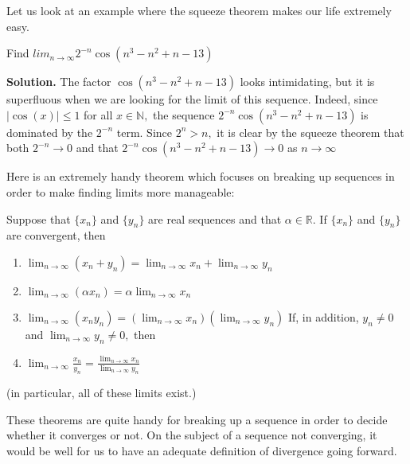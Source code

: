 Let us look at an example where the squeeze theorem makes our life extremely easy.

\begin{example}
Find $lim_{n \to \infty}2^{-n} \cos (n^3 - n^2 + n -13)$ \newline

\textbf{Solution.} The factor $\cos(n^3 - n^2 + n -13)$ looks intimidating, but it is superfluous when we are looking for the limit of this sequence. \newline
Indeed, since $|\cos(x)| \leq 1$ for all $x \in \mathbb{N},$ the sequence $2^{-n} \cos(n^3 - n^2 + n -13)$ is dominated by the $2^{-n}$ term. \newline
Since $2^n > n,$ it is clear by the squeeze theorem that both $2^{-n} \to 0$ and that $2^{-n} \cos(n^3 - n^2 + n -13) \to 0$ as $n \to \infty$ 
\end{example}

Here is an extremely handy theorem which focuses on breaking up sequences in order to make finding limits more manageable:

\begin{theorem}
Suppose that $\{x_n\}$ and $\{y_n\}$ are real sequences and that $\alpha \in \mathbb{R}.$ If $\{x_n\}$ and $\{y_n\}$ are convergent, then
\begin{enumerate}
\item $\lim_{n \to \infty} (x_n + y_n) = \lim_{n \to \infty}x_n + \lim_{n \to \infty}y_n$
\item $\lim_{n \to \infty} (\alpha x_n) = \alpha \lim_{n \to \infty} x_n$
\item $\lim_{n \to \infty}(x_n y_n) = (\lim_{n \to \infty}x_n)(\lim_{n \to \infty}y_n)$\newline
If, in addition, $y_n \neq 0$ and $\lim_{n \to \infty} y_n \neq 0,$ then
\item $\lim_{n \to \infty} \frac{x_n}{y_n} = \frac{\lim_{n \to \infty}x_n}{\lim_{n \to \infty}y_n}$
\end{enumerate}

(in particular, all of these limits exist.)

\end{theorem}

These theorems are quite handy for breaking up a sequence in order to decide whether it converges or not. On the subject of a sequence not converging, it would be well for us to have an adequate definition of divergence going forward.


